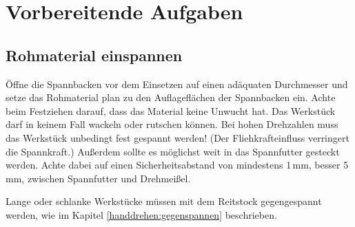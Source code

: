 \documentclass{\basedir/fablab-document}
\begin{document}
\begin{figure}[pc]

\vspace{-4cm}
\end{figure}

\newpage
\pagestyle{fancy}





\newpage
\section{Vorbereitende Aufgaben}
\subsection{Rohmaterial einspannen}

Öffne die Spannbacken vor dem Einsetzen auf einen adäquaten Durchmesser und setze das Rohmaterial
plan zu den Auflageflächen der Spannbacken ein.
Achte beim Festziehen darauf, dass das Material keine Unwucht hat.
Das Werkstück darf in keinem Fall wackeln oder rutschen können.
Bei hohen Drehzahlen muss das Werkstück unbedingt fest gespannt werden!
(Der Fliehkrafteinfluss verringert die Spannkraft.)
Außerdem sollte es möglichst weit in das Spannfutter gesteckt werden.
Achte dabei auf einen Sicherheitsabstand von mindestens 1\,mm, besser 5\,mm, zwischen Spannfutter und Drehmeißel.

Lange oder schlanke Werkstücke müssen mit dem Reitstock gegengespannt werden,
wie im Kapitel \ref{handdrehen:gegenspannen} beschrieben.
\end{document}
